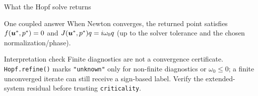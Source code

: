 \begin{frame}{What the Hopf solve returns}
\small
\centering
{}
\vspace{2mm}
\begin{block}{One coupled answer}
When Newton converges, the returned point satisfies
$f(\bm{u}^*,p^*)=0$ and
$J(\bm{u}^*,p^*)q=i\omega_0q$ (up to the solver tolerance and the chosen
normalization/phase).
\end{block}
\begin{alertblock}{Interpretation check}
Finite diagnostics are not a convergence certificate. \texttt{Hopf.refine()}
marks \texttt{"unknown"} only for non-finite diagnostics or $\omega_0\leq0$;
a finite unconverged iterate can still receive a sign-based label. Verify the
extended-system residual before trusting \texttt{criticality}.
\end{alertblock}
\end{frame}

